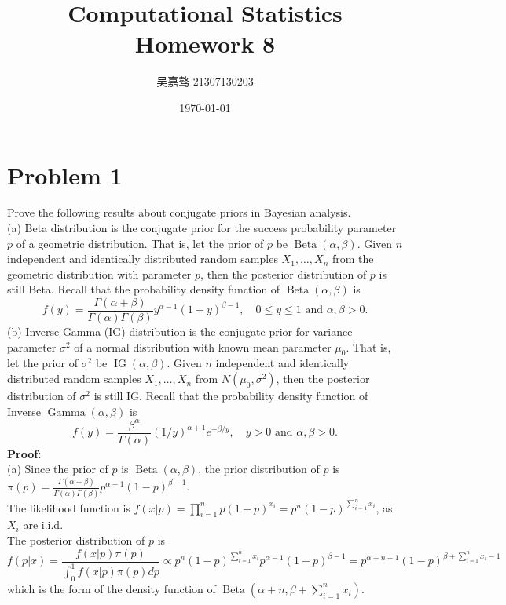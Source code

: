 \documentclass[UTF8]{ctexart}
\title{\textbf{Computational Statistics Homework 8}}
\author{吴嘉骜 21307130203}
\date{\today}
\begin{document}
\maketitle


\section*{Problem 1}
\noindent
Prove the following results about conjugate priors in Bayesian analysis.\\
(a) Beta distribution is the conjugate prior for the success probability parameter $p$ of a geometric distribution. 
That is, let the prior of $p$ be $\operatorname{Beta}(\alpha, \beta)$. 
Given $n$ independent and identically distributed random samples $X_1, \ldots, X_n$ from the geometric distribution with parameter $p$, 
then the posterior distribution of $p$ is still Beta. Recall that the probability density function of $\operatorname{Beta}(\alpha, \beta)$ is
$$
f(y)=\frac{\Gamma(\alpha+\beta)}{\Gamma(\alpha) \Gamma(\beta)} y^{\alpha-1}(1-y)^{\beta-1}, \quad 0 \leq y \leq 1 \text { and } \alpha, \beta>0 .
$$
(b) Inverse Gamma (IG) distribution is the conjugate prior for variance parameter $\sigma^2$ of a normal distribution with known mean parameter $\mu_0$. 
That is, let the prior of $\sigma^2$ be $\operatorname{IG}(\alpha, \beta)$. 
Given $n$ independent and identically distributed random samples $X_1, \ldots, X_n$ from $N\left(\mu_0, \sigma^2\right)$, 
then the posterior distribution of $\sigma^2$ is still IG. Recall that the probability density function of Inverse $\operatorname{Gamma}(\alpha, \beta)$ is
$$
f(y)=\frac{\beta^\alpha}{\Gamma(\alpha)}(1 / y)^{\alpha+1} e^{-\beta / y}, \quad y>0 \text { and } \alpha, \beta>0 .
$$
\textbf{\large Proof:}\\
(a) Since the prior of $p$ is $\operatorname{Beta}(\alpha, \beta)$, the prior distribution of $p$ is $\pi(p)=\frac{\Gamma(\alpha+\beta)}{\Gamma(\alpha) \Gamma(\beta)} p^{\alpha-1}(1-p)^{\beta-1}$.\\
The likelihood function is $f(x|p)=\prod_{i=1}^{n} p(1-p)^{x_i}=p^n(1-p)^{\sum\limits_{i=1}^{n} x_i}$, as $X_i$ are i.i.d.\\
The posterior distribution of $p$ is 
$$f(p|x)=\frac{f(x|p)\pi(p)}{\int_{0}^{1}f(x|p)\pi(p)dp}
\propto  p^n(1-p)^{\sum\limits_{i=1}^{n} x_i}p^{\alpha-1}(1-p)^{\beta-1}
=p^{\alpha+n-1}(1-p)^{\beta+\sum\limits_{i=1}^{n} x_i-1}$$
which is the form of the density function of $\operatorname{Beta}(\alpha+n, \beta+\sum\limits_{i=1}^{n} x_i)$.\\
\end{document}
